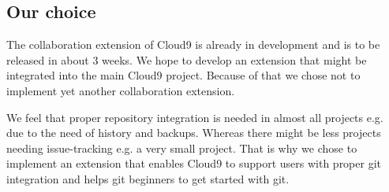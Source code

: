 \subsection{Our choice}
The collaboration extension of Cloud9 is already in development and is to be released in about 3 weeks.
We hope to develop an extension that might be integrated into the main Cloud9 project.
Because of that we chose not to implement yet another collaboration extension.

We feel that proper repository integration is needed in almost all projects e.g. due to the need of history and backups.
Whereas there might be less projects needing issue-tracking e.g. a very small project.
That is why we chose to implement an extension that enables Cloud9 to support users with proper git integration and helps git beginners to get started with git.

